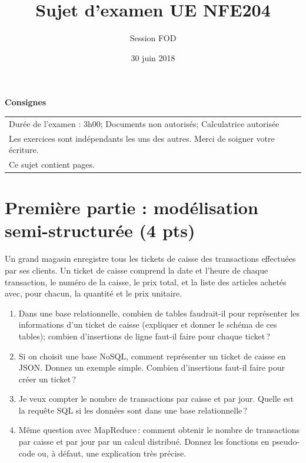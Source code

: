 \documentclass[11pt,a4paper]{article}
\begin{document}
\title{Sujet d'examen UE NFE204}
\author{Session FOD}
\date{30 juin 2018}

\maketitle

\begin{center}
{\bf \Large Consignes}\\
\begin{tabular}{| p{15cm} |}
\hline
Dur\'ee de l'examen : 3h00; Documents non autoris\'es;  Calculatrice autoris\'ee\\

Les exercices sont indépendants les uns des autres. Merci de soigner votre écriture.\\
Ce sujet contient \pageref{LastPage} pages.\\

\hline
\end{tabular}
\end{center}


\section*{Première partie : modélisation semi-structurée (4 pts)}

Un grand magasin enregistre tous les tickets de caisse des transactions effectuées par ses clients.
Un ticket de caisse comprend la date et l'heure de chaque transaction, le numéro de la caisse, le prix total,
et la liste des articles achetés avec, pour chacun, la quantité et le prix unitaire. 

\begin{enumerate}
  \item Dans une base relationnelle, combien de tables faudrait-il pour représenter 
         les informations d'un ticket de caisse (expliquer et donner le schéma de ces tables); combien d'insertions de ligne
             faut-il faire pour chaque ticket\,?
    \item Si on choisit une base NoSQL, comment représenter un ticket de caisse en JSON.
        Donnez un exemple simple. Combien d'insertions faut-il faire pour créer un ticket\,?
   \item Je veux compter le nombre de transactions par caisse et par jour.  Quelle est la requête SQL si les données
       sont dans une base relationnelle\,?
    \item Même question avec MapReduce\,: comment obtenir le nombre de transactions par caisse et par jour
      par un calcul distribué. Donnez les fonctions en pseudo-code ou, à défaut, une explication très précise.
 \end{enumerate}
\end{document}
